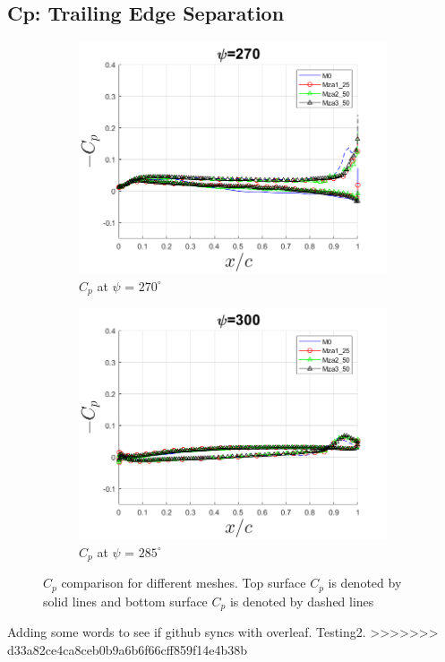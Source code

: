 \subsection{Cp: Trailing Edge Separation}
\begin{figure}
\begin{subfigure}[b]{0.475\textwidth}
\centering
\includegraphics[width=1\textwidth]{figures/zonal_adapt_results/Cp/phase_270.png}
\caption{ $C_p$ at $\psi$ = $270^\circ$}
\label{fig:zonal_Cp_270}
\end{subfigure}
\begin{subfigure}[b]{0.475\textwidth}
\centering
\includegraphics[width=1\textwidth]{figures/zonal_adapt_results/Cp/phase_300.png}
\caption{ $C_p$ at $\psi$ = $285^\circ$}
\label{fig:zonal_Cp_285}
\end{subfigure}
\caption{$C_p$ comparison for different meshes. Top surface $C_p$ is denoted by solid lines and bottom surface $C_p$ is denoted by dashed lines}
\label{fig:zonal_Cp_plots_TEV}
\end{figure}


Adding some words to see if github syncs with overleaf.
Testing2.
>>>>>>> d33a82ce4ca8ceb0b9a6b6f66cff859f14e4b38b
